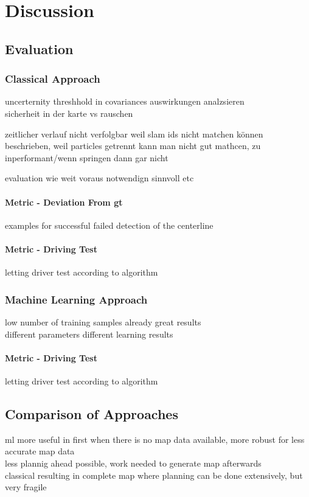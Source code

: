 \chapter{Discussion}

\section{Evaluation}
\subsection{Classical Approach}
uncerternity threshhold in covariances auswirkungen analzsieren\\
sicherheit in der karte vs rauschen

zeitlicher verlauf nicht verfolgbar weil
slam ids nicht matchen können beschrieben,
weil particles getrennt kann man nicht gut mathcen,
zu inperformant/wenn springen dann gar nicht

evaluation wie weit voraus notwendign sinnvoll etc
\subsubsection{Metric - Deviation From \ac{gt}}
examples for successful failed detection of the centerline
\subsubsection{Metric - Driving Test}
letting driver test according to algorithm


\subsection{Machine Learning Approach}

low number of training samples already great results\\
different parameters different learning results


\subsubsection{Metric - Driving Test}
letting driver test according to algorithm

\section{Comparison of Approaches}
ml more useful in first when there is no map data available, more robust for less accurate map data\\
less plannig ahead possible, work needed to generate map afterwards\\
classical resulting in complete map where planning can be done extensively, but very fragile

